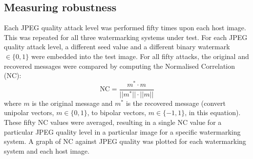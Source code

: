 \documentclass[10pt,twocolumn]{article}
\begin{document}
\subsection{Measuring robustness}
\label{sec:robust}
Each JPEG quality attack level was performed fifty times upon each host image. 
This was repeated for all three watermarking systems under test.
For each JPEG quality attack level, a different seed value and a
different binary watermark $\in\{0,1\}$ were embedded into the test image.  For all fifty attacks, the original 
and recovered messages were compared by computing the Normalised Correlation (NC):
\begin{equation}
	\mbox{NC}= \frac {m^{*} \cdot m} {||m^{*}|| \cdot ||m||}
\end{equation}
where $m$ is the original message and $m^{*}$ is the recovered message (convert unipolar vectors, $m\in\{0,1\}$, to
bipolar vectors, $m\in\{-1,1\}$, in this equation).
These fifty NC values were averaged, resulting in a single NC value for a particular JPEG quality level in a particular image for a 
specific watermarking system. A graph of NC against JPEG quality was plotted for each watermarking system and each host image.
%
\end{document}
